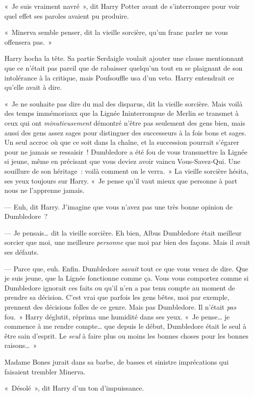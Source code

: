 «~Je suis vraiment navré~», dit Harry Potter avant de s'interrompre pour voir quel effet ses paroles avaient pu produire.

«~Minerva semble penser, dit la vieille sorcière, qu'un franc parler ne vous offensera pas.~»

Harry hocha la tête. Sa partie Serdaigle voulait ajouter une clause mentionnant que ce n'était pas pareil que de rabaisser quelqu'un tout en se plaignant de son intolérance à la critique, mais Poufsouffle usa d'un veto. Harry entendrait ce qu'elle avait à dire.

«~Je ne souhaite pas dire du mal des disparus, dit la vieille sorcière. Mais voilà des temps immémoriaux que la Lignée Ininterrompue de Merlin se transmet à ceux qui ont \emph{minutieusement} démontré n'être pas seulement des gens bien, mais aussi des gens assez sages pour distinguer des successeurs à la fois bons et sages. Un seul accroc où que ce soit dans la chaîne, et la succession pourrait s'égarer pour ne jamais se ressaisir~! Dumbledore a été fou de vous transmettre la Lignée si jeune, même en précisant que vous deviez avoir vaincu Vous-Savez-Qui. Une souillure de son héritage~: voilà comment on le verra.~» La vieille sorcière hésita, ses yeux toujours sur Harry. «~Je pense qu'il vaut mieux que personne à part nous ne l'apprenne jamais.

--- Euh, dit Harry. J'imagine que vous n'avez pas une très bonne opinion de Dumbledore~?

--- Je pensais… dit la vieille sorcière. Eh bien, Albus Dumbledore était meilleur sorcier que moi, une meilleure \emph{personne} que moi par bien des façons. Mais il avait ses défauts.

--- Parce que, euh. Enfin. Dumbledore \emph{savait} tout ce que vous venez de dire. Que je suis jeune, que la Lignée fonctionne comme ça. Vous vous comportez comme si Dumbledore ignorait ces faits ou qu'il n'en a pas tenu compte au moment de prendre sa décision. C'est vrai que parfois les gens bêtes, moi par exemple, prennent des décisions folles de ce genre. Mais pas Dumbledore. Il n'était \emph{pas} fou.~» Harry déglutit, réprima une humidité dans ses yeux. «~Je pense… je commence à me rendre compte… que depuis le début, Dumbledore était le seul à être sain d'esprit. Le \emph{seul} à faire plus ou moins les bonnes choses pour les bonnes raisons…~»

Madame Bones jurait dans sa barbe, de basses et sinistre imprécations qui faisaient trembler Minerva.

«~Désolé~», dit Harry d'un ton d'impuissance.

